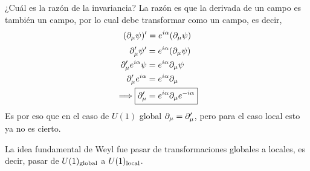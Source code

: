 ¿Cuál es la razón de la invariancia? La razón es que la derivada de un campo es también un campo, por lo cual debe transformar como un campo, es decir,
\begin{equation}
  (\partial_\mu \psi)'=e^{i\alpha }(\partial_\mu \psi)
\end{equation}
\begin{align}
  \partial'_\m \psi'&=e^{i\a }(\partial_\m \psi)\\
  \partial'_\m e^{i\a }\psi&=e^{i\a }\partial_\m \psi\\
  \partial'_\m e^{i\a }&=e^{i\a }\partial_\m \\
\implies \Aboxed{ \partial'_\m &=e^{i\a }\partial_\m e^{-i\a }}
\end{align}
Es por eso que en el caso de $U(1)$ global $\partial_\mu =\partial'_\mu $, pero para el caso local esto ya no es cierto.

La idea fundamental de Weyl fue pasar de transformaciones globales a locales, es decir, pasar de $U(1)_{\rm global}$  a $U(1)_{\rm local}$. 

